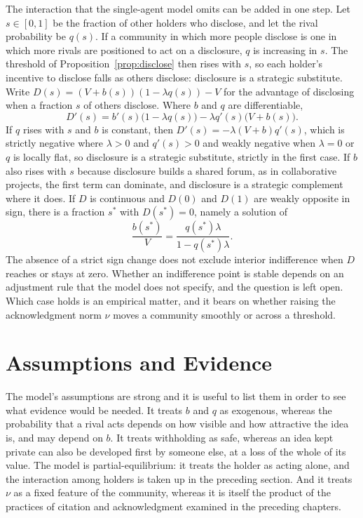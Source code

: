 \documentclass[11pt]{book}
\theoremstyle{definition}
\theoremstyle{remark}
\begin{document}
The interaction that the single-agent model omits can be added in one step. Let $s\in[0,1]$ be the fraction of other holders who disclose, and let the rival probability be $q(s)$. If a community in which more people disclose is one in which more rivals are positioned to act on a disclosure, $q$ is increasing in $s$. The threshold of Proposition~\ref{prop:disclose} then rises with $s$, so each holder's incentive to disclose falls as others disclose: disclosure is a strategic substitute. Write $D(s)=(V+b(s))(1-\lambda q(s))-V$ for the advantage of disclosing when a fraction $s$ of others disclose. Where $b$ and $q$ are differentiable,
\[
D'(s)=b'(s)\bigl(1-\lambda q(s)\bigr)-\lambda q'(s)\bigl(V+b(s)\bigr).
\]
If $q$ rises with $s$ and $b$ is constant, then $D'(s)=-\lambda(V+b)q'(s)$, which is strictly negative where $\lambda>0$ and $q'(s)>0$ and weakly negative when $\lambda=0$ or $q$ is locally flat, so disclosure is a strategic substitute, strictly in the first case. If $b$ also rises with $s$ because disclosure builds a shared forum, as in collaborative projects, the first term can dominate, and disclosure is a strategic complement where it does. If $D$ is continuous and $D(0)$ and $D(1)$ are weakly opposite in sign, there is a fraction $s^\ast$ with $D(s^\ast)=0$, namely a solution of
\[
\frac{b(s^\ast)}{V}=\frac{q(s^\ast)\lambda}{1-q(s^\ast)\lambda}.
\]
The absence of a strict sign change does not exclude interior indifference when $D$ reaches or stays at zero. Whether an indifference point is stable depends on an adjustment rule that the model does not specify, and the question is left open. Which case holds is an empirical matter, and it bears on whether raising the acknowledgment norm $\nu$ moves a community smoothly or across a threshold.

\section{Assumptions and Evidence}

The model's assumptions are strong and it is useful to list them in order to see what evidence would be needed. It treats $b$ and $q$ as exogenous, whereas the probability that a rival acts depends on how visible and how attractive the idea is, and may depend on $b$. It treats withholding as safe, whereas an idea kept private can also be developed first by someone else, at a loss of the whole of its value. The model is partial-equilibrium: it treats the holder as acting alone, and the interaction among holders is taken up in the preceding section. And it treats $\nu$ as a fixed feature of the community, whereas it is itself the product of the practices of citation and acknowledgment examined in the preceding chapters.
\end{document}
